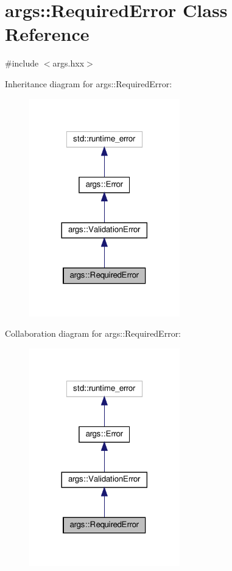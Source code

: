 \hypertarget{classargs_1_1_required_error}{}\section{args\+:\+:Required\+Error Class Reference}
\label{classargs_1_1_required_error}


{\ttfamily \#include $<$args.\+hxx$>$}



Inheritance diagram for args\+:\+:Required\+Error\+:\nopagebreak
\begin{figure}[H]
\begin{center}
\leavevmode
\includegraphics[width=185pt]{classargs_1_1_required_error__inherit__graph}
\end{center}
\end{figure}


Collaboration diagram for args\+:\+:Required\+Error\+:\nopagebreak
\begin{figure}[H]
\begin{center}
\leavevmode
\includegraphics[width=185pt]{classargs_1_1_required_error__coll__graph}
\end{center}
\end{figure}
